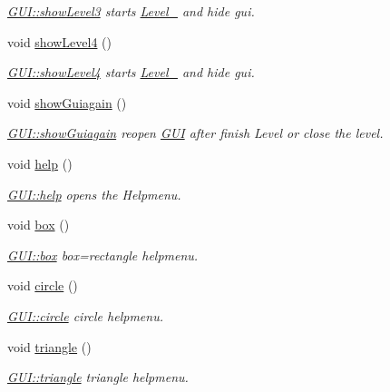 \begin{DoxyCompactItemize}
\begin{DoxyCompactList}\small\item\em \hyperlink{class_g_u_i_ae93c49b9edadf4549bdac5caa3be5f2e}{G\+U\+I\+::show\+Level3} starts \hyperlink{class_level__3}{Level\+\_} and hide gui. \end{DoxyCompactList}\item 
void \hyperlink{class_g_u_i_a40f7ec138fb724ef99b45aacb6c5d3d9}{show\+Level4} ()
\begin{DoxyCompactList}\small\item\em \hyperlink{class_g_u_i_a40f7ec138fb724ef99b45aacb6c5d3d9}{G\+U\+I\+::show\+Level4} starts \hyperlink{class_level__4}{Level\+\_} and hide gui. \end{DoxyCompactList}\item 
void \hyperlink{class_g_u_i_afe5b1ca9bdc2b9565ce96ab6f2a01d6f}{show\+Guiagain} ()
\begin{DoxyCompactList}\small\item\em \hyperlink{class_g_u_i_afe5b1ca9bdc2b9565ce96ab6f2a01d6f}{G\+U\+I\+::show\+Guiagain} reopen \hyperlink{class_g_u_i}{G\+UI} after finish Level or close the level. \end{DoxyCompactList}\item 
void \hyperlink{class_g_u_i_a0cf2f8e739f52bd2e3c9c3605e50d875}{help} ()
\begin{DoxyCompactList}\small\item\em \hyperlink{class_g_u_i_a0cf2f8e739f52bd2e3c9c3605e50d875}{G\+U\+I\+::help} opens the Helpmenu. \end{DoxyCompactList}\item 
void \hyperlink{class_g_u_i_a41279e88f7b65e6aa5b5080dd0ce30fd}{box} ()
\begin{DoxyCompactList}\small\item\em \hyperlink{class_g_u_i_a41279e88f7b65e6aa5b5080dd0ce30fd}{G\+U\+I\+::box} box=rectangle helpmenu. \end{DoxyCompactList}\item 
void \hyperlink{class_g_u_i_a1c15a25fd741e4421ced2507a3f11596}{circle} ()
\begin{DoxyCompactList}\small\item\em \hyperlink{class_g_u_i_a1c15a25fd741e4421ced2507a3f11596}{G\+U\+I\+::circle} circle helpmenu. \end{DoxyCompactList}\item 
void \hyperlink{class_g_u_i_af5799c39952edf8560913cf4703ba493}{triangle} ()
\begin{DoxyCompactList}\small\item\em \hyperlink{class_g_u_i_af5799c39952edf8560913cf4703ba493}{G\+U\+I\+::triangle} triangle helpmenu. \end{DoxyCompactList}\item 

\end{DoxyCompactItemize}
